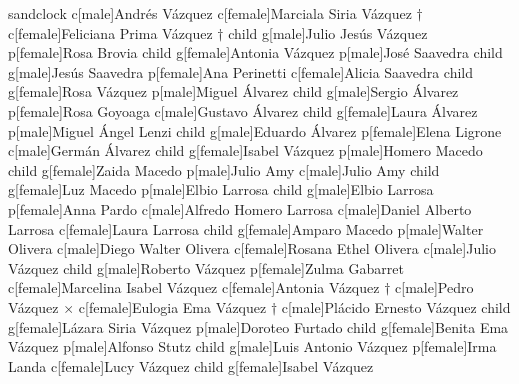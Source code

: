 \documentclass{standalone}
\begin{document}
\begin{genealogypicture}[template=signpost]
sandclock{%
    c[male]{Andrés Vázquez}
    c[female]{Marciala Siria Vázquez $\dagger$}
    c[female]{Feliciana Prima Vázquez $\dagger$}
    child{%
        g[male]{Julio Jesús Vázquez}
        p[female]{Rosa Brovia}
        child{%
            g[female]{Antonia Vázquez}
            p[male]{José Saavedra}
            child{%
                g[male]{Jesús Saavedra}
                p[female]{Ana Perinetti}
                c[female]{Alicia Saavedra}
            }
        }
        child{%
            g[female]{Rosa Vázquez}
            p[male]{Miguel Álvarez}
            child{%
                g[male]{Sergio Álvarez}
                p[female]{Rosa Goyoaga}
                c[male]{Gustavo Álvarez}
                child{%
                    g[female]{Laura Álvarez}
                    p[male]{Miguel Ángel Lenzi}
                }
            }
            child{%
                g[male]{Eduardo Álvarez}
                p[female]{Elena Ligrone}
                c[male]{Germán Álvarez}
            }
        }
        child{%
            g[female]{Isabel Vázquez}
            p[male]{Homero Macedo}
            child{%
                g[female]{Zaida Macedo}
                p[male]{Julio Amy}
                c[male]{Julio Amy}
            }
            child{%
                g[female]{Luz Macedo}
                p[male]{Elbio Larrosa}
                child{%
                    g[male]{Elbio Larrosa}
                    p[female]{Anna Pardo}
                }
                c[male]{Alfredo Homero Larrosa}
                c[male]{Daniel Alberto Larrosa}
                c[female]{Laura Larrosa}
            }
            child{%
                g[female]{Amparo Macedo}
                p[male]{Walter Olivera}
                c[male]{Diego Walter Olivera}
                c[female]{Rosana Ethel Olivera}
            }
        }
        c[male]{Julio Vázquez}
        child{%
            g[male]{Roberto Vázquez}
            p[female]{Zulma Gabarret}
        }
    }
    c[female]{Marcelina Isabel Vázquez}
    c[female]{Antonia Vázquez $\dagger$}
    c[male]{Pedro Vázquez $\times$}
    c[female]{Eulogia Ema Vázquez $\dagger$}
    c[male]{Plácido Ernesto Vázquez}
    child{%
        g[female]{Lázara Siria Vázquez}
        p[male]{Doroteo Furtado}
    }
    child{%
        g[female]{Benita Ema Vázquez}
        p[male]{Alfonso Stutz}
    }
    child{%
        g[male]{Luis Antonio Vázquez}
        p[female]{Irma Landa}
        c[female]{Lucy Vázquez}
        child{%
            g[female]{Isabel Vázquez}
}}}
\end{genealogypicture}
\end{document}

